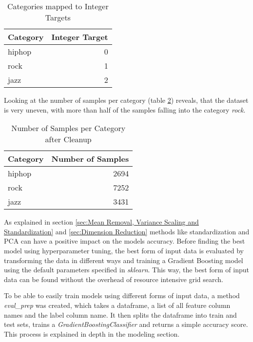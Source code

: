 
\begin{table}[H]
    \centering
    \caption{Categories mapped to Integer Targets}
    \label{tbl:Categories mapped to Integer Targets}
    \begin{tabular}{lr} 
        \toprule
        Category & Integer Target \\ [0.5ex]
        \midrule
        hiphop & 0 \\ [1ex]
        rock & 1 \\ [1ex]
        jazz & 2 \\ [1ex]
        \bottomrule
    \end{tabular}
\end{table}

Looking at the number of samples per category (table \ref{tbl:Number of Samples per Category after Cleanup}) reveals, that the dataset
is very uneven, with more than half of the samples falling into the category \emph{rock}.

\begin{table}[H]
    \centering
    \caption{Number of Samples per Category after Cleanup}
    \label{tbl:Number of Samples per Category after Cleanup}
    \begin{tabular}{lr} 
        \toprule
        Category & Number of Samples \\ [0.5ex]
        \midrule
        hiphop & 2694 \\ [1ex]
        rock & 7252 \\ [1ex]
        jazz & 3431 \\ [1ex]
        \bottomrule
    \end{tabular}
\end{table}

As explained in section \ref{sec:Mean Removal, Variance Scaling and Standardization} and \ref{sec:Dimension Reduction}
methods like standardization and \ac{PCA} can have a positive impact on the models accuracy.
Before finding the best model using hyperparameter tuning, the best form of input data is evaluated by transforming
the data in different ways and training a Gradient Boosting model using the default parameters specified in \emph{sklearn}.
This way, the best form of input data can be found without the overhead of resource intensive grid search.

To be able to easily train models using different forms of input data, a method \emph{eval\_prep} was created,
which takes a dataframe, a list of all feature column names and the label column name. It then splits the dataframe
into train and test sets, trains a \emph{GradientBoostingClassifier} and returns a simple accuracy score.
This process is explained in depth in the modeling section.

